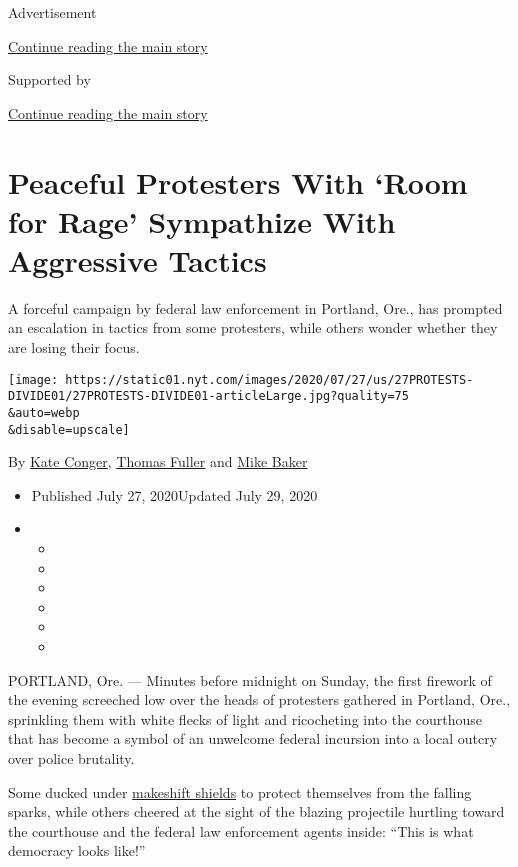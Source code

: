 Advertisement

\protect\hyperlink{after-top}{Continue reading the main story}

Supported by

\protect\hyperlink{after-sponsor}{Continue reading the main story}

\hypertarget{peaceful-protesters-with-room-for-rage-sympathize-with-aggressive-tactics}{%
\section{Peaceful Protesters With `Room for Rage' Sympathize With
Aggressive
Tactics}\label{peaceful-protesters-with-room-for-rage-sympathize-with-aggressive-tactics}}

A forceful campaign by federal law enforcement in Portland, Ore., has
prompted an escalation in tactics from some protesters, while others
wonder whether they are losing their focus.

\texttt{[image: https://static01.nyt.com/images/2020/07/27/us/27PROTESTS-DIVIDE01/27PROTESTS-DIVIDE01-articleLarge.jpg?quality=75\\\&auto=webp\\\&disable=upscale]}

By \href{https://www.nytimes.com/by/kate-conger}{Kate Conger},
\href{https://www.nytimes.com/by/thomas-fuller}{Thomas Fuller} and
\href{https://www.nytimes.com/by/mike-baker}{Mike Baker}

\begin{itemize}
\item
  Published July 27, 2020Updated July 29, 2020
\item
  \begin{itemize}
  \item
  \item
  \item
  \item
  \item
  \item
  \end{itemize}
\end{itemize}

PORTLAND, Ore. --- Minutes before midnight on Sunday, the first firework
of the evening screeched low over the heads of protesters gathered in
Portland, Ore., sprinkling them with white flecks of light and
ricocheting into the courthouse that has become a symbol of an unwelcome
federal incursion into a local outcry over police brutality.

Some ducked under
\href{https://www.nytimes.com/2020/07/22/us/portland-protest-tactics.html}{makeshift
shields} to protect themselves from the falling sparks, while others
cheered at the sight of the blazing projectile hurtling toward the
courthouse and the federal law enforcement agents inside: ``This is what
democracy looks like!''

